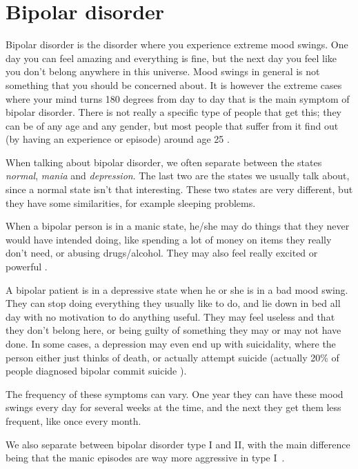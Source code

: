 \newpage
\section{Bipolar disorder}

Bipolar disorder is the disorder where you experience extreme mood swings. One day you can feel amazing and 
everything is fine, but the next day you feel like you don't belong anywhere in this universe. 
Mood swings in general is not something that you should be concerned about. It is however the extreme cases where 
your mind turns 180 degrees from day to day that is the main symptom of bipolar disorder. 
There is not really a specific type of people that get this; they can be of any age and any gender, 
but most people that suffer from it find out (by having an experience or episode) around age 25 \cite{bipolar_statistics}. 

When talking about bipolar disorder, we often separate between the states \emph{normal}, \emph{mania} 
and \emph{depression}. The last two are the states we usually talk about, since a normal state isn't that interesting. 
These two states are very different, but they have some similarities, for example sleeping problems. 

When a bipolar person is in a manic state, he/she may do things that they never would have intended doing, 
like spending a lot of money on items they really don't need, or abusing drugs/alcohol. 
They may also feel really excited or powerful \cite{bipolar_overview}. 

A bipolar patient is in a depressive state when he or she is in a bad mood swing. They can stop doing everything 
they usually like to do, and lie down in bed all day with no motivation to do anything useful. 
They may feel useless and that they don't belong here, or being guilty of something they may or may not have done. 
In some cases, a depression may even end up with suicidality, where the person either just thinks of death, 
or actually attempt suicide (actually 20\% of people diagnosed bipolar commit suicide \cite{bipolar_statistics}). %

The frequency of these symptoms can vary. One year they can have these mood swings every day for several weeks at the time, 
and the next they get them less frequent, like once every month. 

We also separate between bipolar disorder type I and II, with the main difference being that the manic episodes 
are way more aggressive in type I \cite{bipolar_types}.

